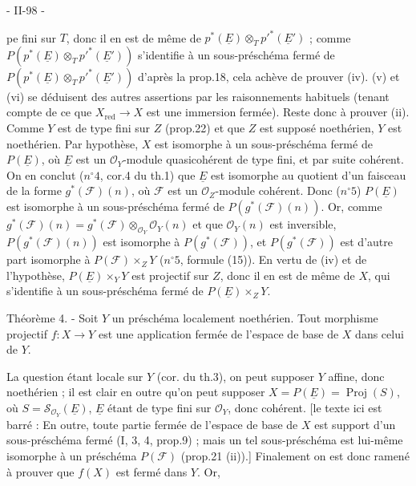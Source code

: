 
- II-98 -

pe fini sur $T$, donc il en est de même de $p^*(\underline{E}) \otimes_T p'^*(\underline{E}')$ ; comme $P(p^*(\underline{E}) \otimes_T p'^*(\underline{E}'))$ s'identifie à un sous-préschéma fermé de $P(p^*(\underline{E}) \otimes_T p'^*(\underline{E}'))$ d'après la prop.18, cela achève de prouver (iv). (v) et (vi) se déduisent des autres assertions par les raisonnements habituels (tenant compte de ce que $X_{\text{red}} \to X$ est une immersion fermée). Reste donc à prouver (ii). Comme $Y$ est de type fini sur $Z$ (prop.22) et que $Z$ est supposé noethérien, $Y$ est noethérien. Par hypothèse, $X$ est isomorphe à un sous-préschéma fermé de $P(\underline{E})$, où $\underline{E}$ est un $\mathcal{O}_Y$-module quasicohérent de type fini, et par suite cohérent. On en conclut ($n^\circ 4$, cor.4 du th.1) que $\underline{E}$ est isomorphe au quotient d'un faisceau de la forme $g^*(\mathcal{F})(n)$, où $\mathcal{F}$ est un $\mathcal{O}_Z$-module cohérent. Donc ($n^\circ 5$) $P(\underline{E})$ est isomorphe à un sous-préschéma fermé de $P(g^*(\mathcal{F})(n))$. Or, comme $g^*(\mathcal{F})(n) = g^*(\mathcal{F}) \otimes_{\mathcal{O}_Y} \mathcal{O}_Y(n)$ et que $\mathcal{O}_Y(n)$ est inversible, $P(g^*(\mathcal{F})(n))$ est isomorphe à $P(g^*(\mathcal{F}))$, et $P(g^*(\mathcal{F}))$ est d'autre part isomorphe à $P(\mathcal{F}) \times_Z Y$ ($n^\circ 5$, formule (15)). En vertu de (iv) et de l'hypothèse, $P(\underline{E}) \times_Y Y$ est projectif sur $Z$, donc il en est de même de $X$, qui s'identifie à un sous-préschéma fermé de $P(\underline{E}) \times_Z Y$.

Théorème 4. - Soit $Y$ un préschéma localement noethérien. Tout morphisme projectif $f: X \to Y$ est une application fermée de l'espace de base de $X$ dans celui de $Y$.

La question étant locale sur $Y$ (cor. du th.3), on peut supposer $Y$ affine, donc noethérien ; il est clair en outre qu'on peut supposer $X = P(\underline{E}) = \operatorname{Proj}(S)$, où $S = \mathcal{S}_{\mathcal{O}_Y}(\underline{E})$, $\underline{E}$ étant de type fini sur $\mathcal{O}_Y$, donc cohérent. [le texte ici est barré : En outre, toute partie fermée de l'espace de base de $X$ est support d'un sous-préschéma fermé (I, 3, 4, prop.9) ; mais un tel sous-préschéma est lui-même isomorphe à un préschéma $P(\mathcal{F})$ (prop.21 (ii)).] Finalement on est donc ramené à prouver que $f(X)$ est fermé dans $Y$. Or,

